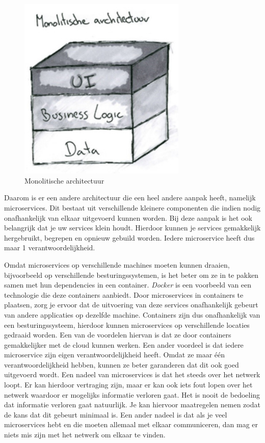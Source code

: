 \begin{figure}[h!]
    \centering
    \includegraphics[width=80mm]{../monolith.png}
    \caption{Monolitische architectuur}
        
\end{figure}

Daarom is er een andere architectuur die een heel andere aanpak heeft, namelijk microservices. Dit bestaat uit verschillende kleinere componenten die indien nodig onafhankelijk van elkaar uitgevoerd kunnen worden. Bij deze aanpak is het ook belangrijk dat je uw services klein houdt. Hierdoor kunnen je services gemakkelijk hergebruikt, begrepen en opnieuw gebuild worden. Iedere microservice heeft dus maar 1 verantwoordelijkheid.

Omdat microservices op verschillende machines moeten kunnen draaien, bijvoorbeeld op verschillende besturingssystemen, is het beter om ze in te pakken samen met hun dependencies in een container. \emph{Docker} is een voorbeeld van een technologie die deze containers aanbiedt. Door microservices in containers te plaatsen, zorg je ervoor dat de uitvoering van deze services onafhankelijk gebeurt van andere applicaties op dezelfde machine. Containers zijn dus onafhankelijk van een besturingssysteem, hierdoor kunnen microservices op verschillende locaties gedraaid worden. Een van de voordelen hiervan is dat ze door containers gemakkelijker met de cloud kunnen werken. Een ander voordeel is dat iedere microservice zijn eigen verantwoordelijkheid heeft. Omdat ze maar één verantwoordelijkheid hebben, kunnen ze beter garanderen dat dit ook goed uitgevoerd wordt. Een nadeel van microservices is dat het steeds over het netwerk loopt. Er kan hierdoor vertraging zijn, maar er kan ook iets fout lopen over het netwerk waardoor er mogelijks informatie verloren gaat. Het is nooit de bedoeling dat informatie verloren gaat natuurlijk. Je kan hiervoor maatregelen nemen zodat de kans dat dit gebeurt minimaal is. Een ander nadeel is dat als je veel microservices hebt en die moeten allemaal met elkaar communiceren, dan mag er niets mis zijn met het netwerk om elkaar te vinden.

